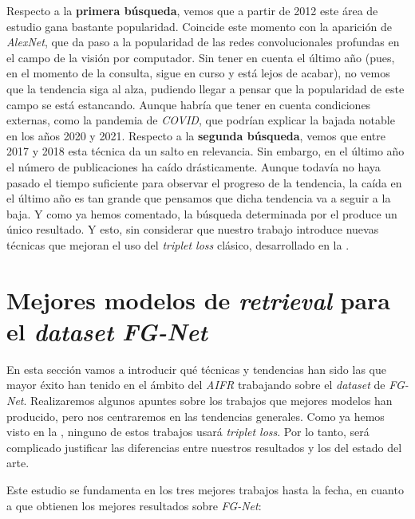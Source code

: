Respecto a la \textbf{primera búsqueda}, vemos que a partir de 2012 este área de estudio gana bastante popularidad. Coincide este momento con la aparición de \textit{AlexNet}, que da paso a la popularidad de las redes convolucionales profundas en el campo de la visión por computador. Sin tener en cuenta el último año (pues, en el momento de la consulta, sigue en curso y está lejos de acabar), no vemos que la tendencia siga al alza, pudiendo llegar a pensar que la popularidad de este campo se está estancando. Aunque habría que tener en cuenta condiciones externas, como la pandemia de \textit{COVID}, que podrían explicar la bajada notable en los años 2020 y 2021. Respecto a la \textbf{segunda búsqueda}, vemos que entre 2017 y 2018 esta técnica da un salto en relevancia. Sin embargo, en el último año el número de publicaciones ha caído drásticamente. Aunque todavía no haya pasado el tiempo suficiente para observar el progreso de la tendencia, la caída en el último año es tan grande que pensamos que dicha tendencia va a seguir a la baja. Y como ya hemos comentado, la búsqueda determinada por el  produce un único resultado.  Y esto, sin considerar que nuestro trabajo introduce nuevas técnicas que mejoran el uso del \textit{triplet loss} clásico, desarrollado en la .

\section{Mejores modelos de \textit{retrieval} para el \textit{dataset} \textit{FG-Net}} \label{isec:mejores_modelos_estado_arte}

En esta sección vamos a introducir qué técnicas y tendencias han sido las que mayor éxito han tenido en el ámbito del \textit{AIFR} trabajando sobre el \textit{dataset} de \textit{FG-Net}. Realizaremos algunos apuntes sobre los trabajos que mejores modelos han producido, pero nos centraremos en las tendencias generales.
Como ya hemos visto en la , ninguno de estos trabajos usará \textit{triplet loss}. Por lo tanto, será complicado justificar las diferencias entre nuestros resultados y los del estado del arte.

Este estudio se fundamenta en los tres mejores trabajos hasta la fecha, en cuanto a que obtienen los mejores resultados sobre \textit{FG-Net}:

